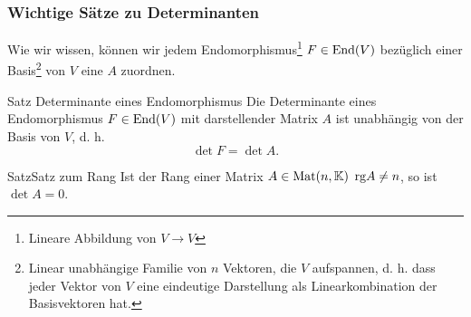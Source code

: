 \subsubsection{Wichtige Sätze zu Determinanten}
Wie wir wissen, können wir jedem Endomorphismus\footnote{Lineare Abbildung von $V\to V$} $F\in\text{End}(V)$ bezüglich einer Basis\footnote{Linear unabhängige Familie von $n$ Vektoren, die $V$ aufspannen, d. h. dass jeder Vektor von $V$ eine eindeutige Darstellung als Linearkombination der Basisvektoren hat.} von $V$ eine  $A$ zuordnen.
\begin{Satz}{Satz}
{Determinante eines Endomorphismus}
Die Determinante eines Endomorphismus $F\in\text{End}(V)$ mit darstellender Matrix $A$ ist unabhängig von der Basis von $V$, d. h.
\begin{equation}
    \det F=\det A.
\end{equation}
\end{Satz}
\begin{Satz}
{Satz}{Satz zum Rang}
Ist der Rang einer Matrix $A\in\text{Mat}(n,\mathbb{K})$ $\text{rg} A\neq n$, so ist $\det A=0$.
\end{Satz}

